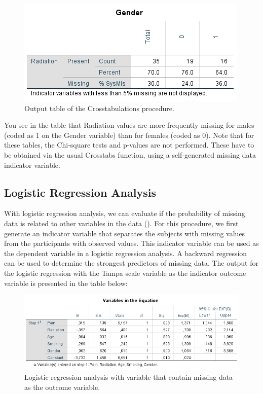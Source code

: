 \documentclass[
]{book}
\begin{document}
\begin{figure}

{\centering \includegraphics[width=0.7\linewidth]{images/Crosstabulation} 

}

\caption{Output table of the Crosstabulations procedure.}\label{fig:tab2-8}
\end{figure}

You see in the table that Radiation values are more frequently missing for males (coded as 1 on the Gender variable) than for females (coded as 0). Note that for these tables, the Chi-square tests and p-values are not performed. These have to be obtained via the usual Crosstabs function, using a self-generated missing data indicator variable.

\hypertarget{logistic-regression-analysis}{%
\subsection{Logistic Regression Analysis}\label{logistic-regression-analysis}}

With logistic regression analysis, we can evaluate if the probability of missing data is related to other variables in the data (\citet{Ridout1991}). For this procedure, we first generate an indicator variable that separates the subjects with missing values from the participants with observed values. This indicator variable can be used as the dependent variable in a logistic regression analysis. A backward regression can be used to determine the strongest predictors of missing data. The output for the logistic regression with the Tampa scale variable as the indicator outcome variable is presented in the table below:

\begin{figure}

{\centering \includegraphics[width=0.9\linewidth]{images/tab2.6} 

}

\caption{Logistic regression analysis with variable that contain missing data as the outcome variable.}\label{fig:tab2-6}
\end{figure}
\end{document}
